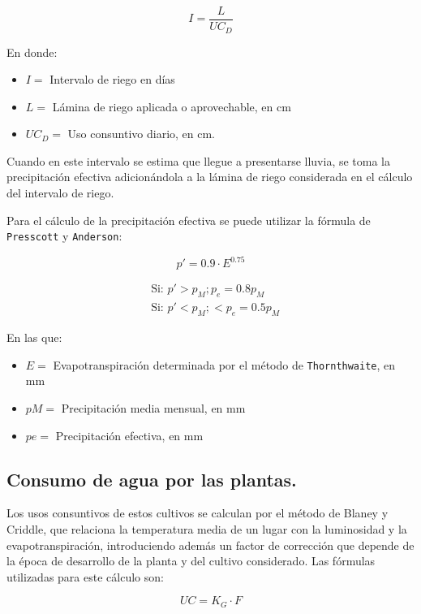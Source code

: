 \begin{equation}
	I=\frac{L}{UC_D}
\end{equation}

En donde:
\begin{itemize}
	\item $I =$ Intervalo de riego en días
	\item $L =$ Lámina de riego aplicada o aprovechable, en cm
	\item $UC_D=$ Uso consuntivo diario, en cm.
\end{itemize}

Cuando en este intervalo se estima que llegue a presentarse lluvia, se toma la
precipitación efectiva adicionándola a la lámina de riego considerada en el cálculo del
intervalo de riego.

Para el cálculo de la precipitación efectiva se puede utilizar la fórmula de
\texttt{Presscott} y \texttt{Anderson}:

\begin{equation}
	p'= 0.9\cdot E^{0.75}
\end{equation}

\begin{align*}
	 & \text{Si: } p' > p_M; p_e = 0.8 p_M   \\
	 & \text{Si: } p' < p_M; < p_e = 0.5 p_M
\end{align*}

En las que:

\begin{itemize}
	\item $E =$ Evapotranspiración determinada por el método de \texttt{Thornthwaite}, en mm
	\item $pM =$ Precipitación media mensual, en mm
	\item $pe =$ Precipitación efectiva, en mm
\end{itemize}


\subsection{Consumo de agua por las plantas.}

Los usos consuntivos de estos cultivos se calculan por el método de Blaney y
Criddle, que relaciona la temperatura media de un lugar con la luminosidad y la
evapotranspiración, introduciendo además un factor de corrección que depende de la
época de desarrollo de la planta y del cultivo considerado.
Las fórmulas utilizadas para este cálculo son:

\begin{equation}
	UC = K_G \cdot F
\end{equation}

